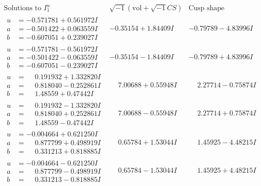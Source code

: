 \documentclass[1p]{elsarticle_modified}
\theoremstyle{definition}
\newcommand{\I}{\sqrt{-1}}
\begin{document}
$$\begin{array}{c|c|c}  
\text{Solutions to }I^u_{1}& \I (\text{vol} + \sqrt{-1}CS) & \text{Cusp shape}\\
 \hline 
\begin{aligned}
u &= -0.571781 + 0.561972 I \\
a &= -0.501422 + 0.063559 I \\
b &= -0.607051 + 0.239027 I\end{aligned}
 & -0.35154 + 1.84409 I & -0.79789 - 4.83996 I \\ \hline\begin{aligned}
u &= -0.571781 - 0.561972 I \\
a &= -0.501422 - 0.063559 I \\
b &= -0.607051 - 0.239027 I\end{aligned}
 & -0.35154 - 1.84409 I & -0.79789 + 4.83996 I \\ \hline\begin{aligned}
u &= \phantom{-}0.191932 + 1.332820 I \\
a &= \phantom{-}0.818040 - 0.252861 I \\
b &= \phantom{-}1.48559 + 0.47442 I\end{aligned}
 & \phantom{-}7.00688 + 0.55948 I & \phantom{-}2.27714 - 0.75874 I \\ \hline\begin{aligned}
u &= \phantom{-}0.191932 - 1.332820 I \\
a &= \phantom{-}0.818040 + 0.252861 I \\
b &= \phantom{-}1.48559 - 0.47442 I\end{aligned}
 & \phantom{-}7.00688 - 0.55948 I & \phantom{-}2.27714 + 0.75874 I \\ \hline\begin{aligned}
u &= -0.004664 + 0.621250 I \\
a &= \phantom{-}0.877799 + 0.498919 I \\
b &= \phantom{-}0.331213 + 0.818885 I\end{aligned}
 & \phantom{-}0.65784 + 1.53044 I & \phantom{-}1.45925 - 4.48215 I \\ \hline\begin{aligned}
u &= -0.004664 - 0.621250 I \\
a &= \phantom{-}0.877799 - 0.498919 I \\
b &= \phantom{-}0.331213 - 0.818885 I\end{aligned}
 & \phantom{-}0.65784 - 1.53044 I & \phantom{-}1.45925 + 4.48215 I \\ \hline\begin{aligned}

\end{aligned}
\end{array}$$
\end{document}
